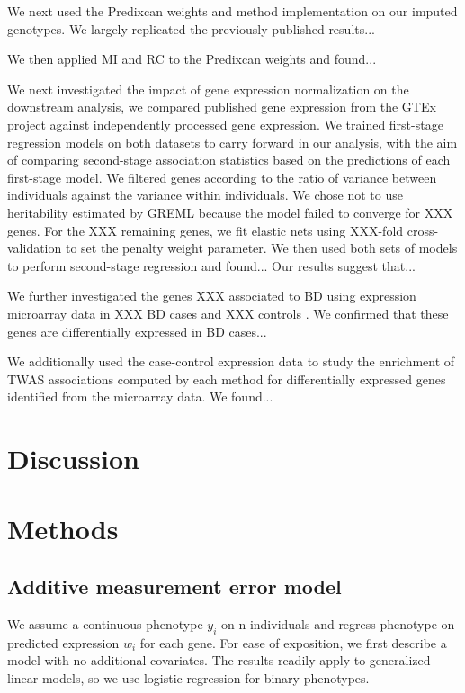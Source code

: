 \documentclass{article}
\begin{document}
We next used the Predixcan weights and method implementation on our imputed
genotypes. We largely replicated the previously published results...

We then applied MI and RC to the Predixcan weights and found...

We next investigated the impact of gene expression normalization on the
downstream analysis, we compared published gene expression from the GTEx
project against independently processed gene expression. We trained first-stage
regression models on both datasets to carry forward in our analysis, with the
aim of comparing second-stage association statistics based on the predictions
of each first-stage model. We filtered genes according to the ratio of variance
between individuals against the variance within individuals. We chose not to
use heritability estimated by GREML\cite{10.1016/j.ajhg.2010.11.011} because
the model failed to converge for XXX genes. For the XXX remaining genes, we fit
elastic nets using XXX-fold cross-validation to set the penalty weight
parameter. We then used both sets of models to perform second-stage regression
and found... Our results suggest that...

We further investigated the genes XXX associated to BD using expression
microarray data in XXX BD cases and XXX controls \cite{xxx}. We confirmed that
these genes are differentially expressed in BD cases...

We additionally used the case-control expression data to study the enrichment
of TWAS associations computed by each method for differentially expressed genes
identified from the microarray data. We found...

\section{Discussion}

\section{Methods}

\subsection{Additive measurement error model}

We assume a continuous phenotype \(y_i\) on n individuals and regress phenotype
on predicted expression \(w_i\) for each gene. For ease of exposition, we first
describe a model with no additional covariates. The results readily apply to
generalized linear models, so we use logistic regression for binary phenotypes.
\end{document}
